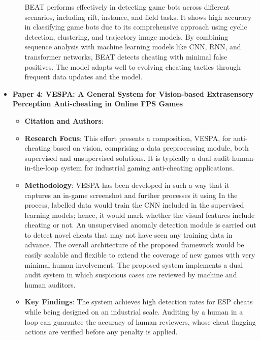 \documentclass[a4paper, 12pt]{article}
\begin{document}
\begin{itemize}
\begin{itemize}
        BEAT performs effectively in detecting game bots across different scenarios, including rift, instance, and field tasks. It shows high accuracy in classifying game bots due to its comprehensive approach using cyclic detection, clustering, and trajectory image models. By combining sequence analysis with machine learning models like CNN, RNN, and transformer networks, BEAT detects cheating with minimal false positives. The model adapts well to evolving cheating tactics through frequent data updates and the model.
    \end{itemize}
    \item \textbf{Paper 4: VESPA: A General System for Vision-based Extrasensory Perception Anti-cheating in Online FPS Games}
    \begin{itemize}
        \item \textbf{Citation and Authors}: \cite{zhao_2023_vespa}
        \item \textbf{Research Focus}: This effort presents a composition, VESPA, for anti-cheating based on vision, comprising a data preprocessing module, both supervised and unsupervised solutions. It is typically a dual-audit human-in-the-loop system for industrial gaming anti-cheating applications.
        \item \textbf{Methodology}: VESPA has been developed in such a way that it captures an in-game screenshot and further processes it using In the process, labelled data would train the CNN included in the supervised learning models; hence, it would mark whether the visual features include cheating or not. An unsupervised anomaly detection module is carried out to detect novel cheats that may not have seen any training data in advance. The overall architecture of the proposed framework would be easily scalable and flexible to extend the coverage of new games with very minimal human involvement. The proposed system implements a dual audit system in which suspicious cases are reviewed by machine and human auditors.
        \item \textbf{Key Findings}: The system achieves high detection rates for ESP cheats while being designed on an industrial scale. Auditing by a human in a loop can guarantee the accuracy of human reviewers, whose cheat flagging actions are verified before any penalty is applied.
    \end{itemize}
\end{itemize}
\end{document}
